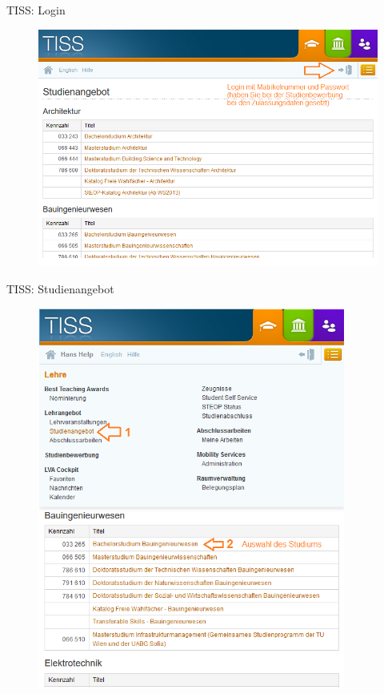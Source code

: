 \documentclass{beamer}
\begin{document}
\begin{frame}{TISS: Login}
    \begin{figure}[htp]
        \centering
        \includegraphics[width=1\textwidth]{tiss_login.png}
    \end{figure}
\end{frame}

\begin{frame}{TISS: Studienangebot}
    \begin{figure}[htp]
        \centering
        \includegraphics[width=0.9\textwidth]{tiss_studienangebot.png}
    \end{figure}
\end{frame}
\end{document}
